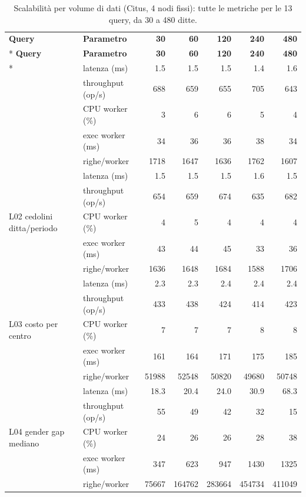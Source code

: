 \begingroup
\footnotesize
\begin{longtable}{@{}llrrrrr@{}}
\caption{Scalabilità per volume di dati (Citus, 4 nodi fissi): tutte le metriche per le 13 query, da 30 a 480 ditte.}\label{tab:scaling-dati-full}\\
\toprule \textbf{Query} & \textbf{Parametro} & \textbf{30} & \textbf{60} & \textbf{120} & \textbf{240} & \textbf{480} \\* \midrule \endfirsthead
\toprule \textbf{Query} & \textbf{Parametro} & \textbf{30} & \textbf{60} & \textbf{120} & \textbf{240} & \textbf{480} \\* \midrule \endhead
\multirow{5}{*}{L01 cedolino singolo} & latenza (ms)     & 1.5 & 1.5 & 1.5 & 1.4 & 1.6 \\
 & throughput (op/s) & 688 & 659 & 655 & 705 & 643 \\
 & CPU worker (\%)   & 3 & 6 & 6 & 5 & 4 \\
 & exec worker (ms)  & 34 & 36 & 36 & 38 & 34 \\
 & righe/worker      & 1718 & 1647 & 1636 & 1762 & 1607 \\ \midrule
\multirow{5}{*}{L02 cedolini ditta/periodo} & latenza (ms)     & 1.5 & 1.5 & 1.5 & 1.6 & 1.5 \\
 & throughput (op/s) & 654 & 659 & 674 & 635 & 682 \\
 & CPU worker (\%)   & 4 & 5 & 4 & 4 & 4 \\
 & exec worker (ms)  & 43 & 44 & 45 & 33 & 36 \\
 & righe/worker      & 1636 & 1648 & 1684 & 1588 & 1706 \\ \midrule
\multirow{5}{*}{L03 costo per centro} & latenza (ms)     & 2.3 & 2.3 & 2.4 & 2.4 & 2.4 \\
 & throughput (op/s) & 433 & 438 & 424 & 414 & 423 \\
 & CPU worker (\%)   & 7 & 7 & 7 & 8 & 8 \\
 & exec worker (ms)  & 161 & 164 & 171 & 175 & 185 \\
 & righe/worker      & 51988 & 52548 & 50820 & 49680 & 50748 \\ \midrule
\multirow{5}{*}{L04 gender gap mediano} & latenza (ms)     & 18.3 & 20.4 & 24.0 & 30.9 & 68.3 \\
 & throughput (op/s) & 55 & 49 & 42 & 32 & 15 \\
 & CPU worker (\%)   & 24 & 26 & 26 & 28 & 38 \\
 & exec worker (ms)  & 347 & 623 & 947 & 1430 & 1325 \\
 & righe/worker      & 75667 & 164762 & 283664 & 454734 & 411049 \\ \midrule

\end{longtable}
